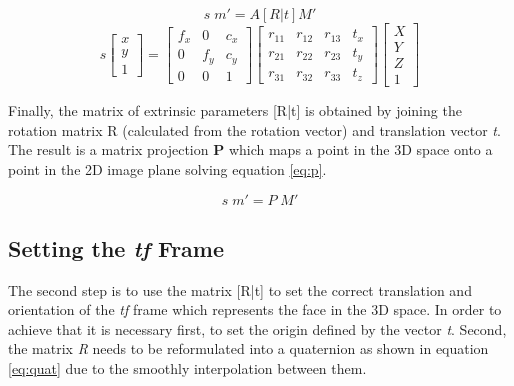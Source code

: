 \documentclass{sig-alternate}
\begin{document}
\begin{equation}
s  \; m' = A [R|t] M'
\label{eq:pinHole}
\end{equation}
\begin{equation}
s
\begin{bmatrix}
x \\
y \\
1
\end{bmatrix}
=
\begin{bmatrix}
f_x & 0 & c_x  \\
0 & f_y & c_y  \\
0 & 0 & 1 
\end{bmatrix}
\begin{bmatrix}
r_{11} & r_{12} & r_{13} & t_x  \\
r_{21} & r_{22} & r_{23} & t_y  \\
r_{31} & r_{32} & r_{33} & t_z  
\end{bmatrix}
\begin{bmatrix}
X \\
Y \\
Z \\
1
\end{bmatrix}
\label{eq:pinHole2}
\end{equation}

Finally, the matrix of extrinsic parameters [R|t] is obtained by joining the rotation matrix R (calculated from the rotation vector) and translation vector \textit{t}. The result is a matrix projection \textbf{P} which maps a point in the 3D space onto a point in the 2D image plane solving equation \ref{eq:p}.

\begin{equation}
s  \; m' = P \; M'
\label{eq:p}
\end{equation}

\subsection{Setting the \textit{tf} Frame}
The second step is to use the matrix [R|t] to set the correct translation and orientation of the \textit{tf} frame which represents the face in the 3D space. In order to achieve that it is necessary first, to set the origin defined by the vector \textit{t}. Second, the matrix \textit{R} needs to be reformulated into a quaternion as shown in equation \ref{eq:quat} due to the smoothly interpolation between them.
\end{document}
